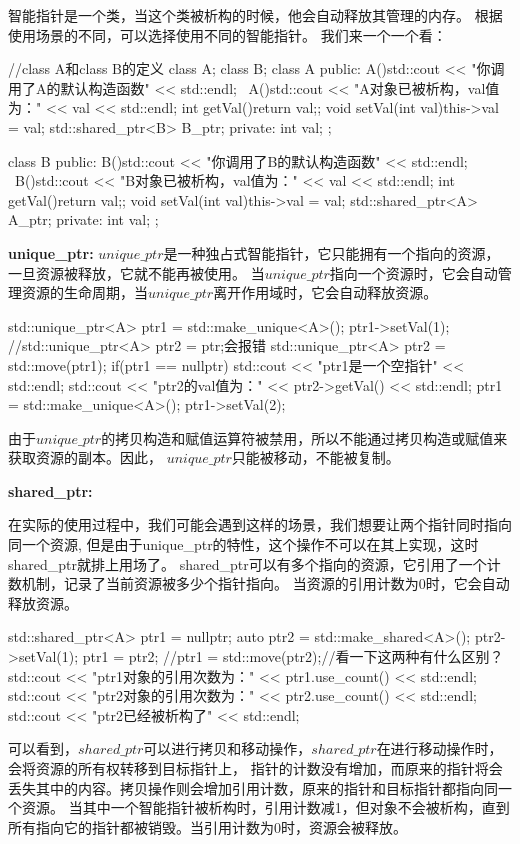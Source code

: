 智能指针是一个类，当这个类被析构的时候，他会自动释放其管理的内存。
根据使用场景的不同，可以选择使用不同的智能指针。
我们来一个一个看：

\begin{tcode}
//class A和class B的定义
class A;
class B;
class A{
public:
    A(){std::cout << "你调用了A的默认构造函数" << std::endl;}
    ~A(){std::cout << "A对象已被析构，val值为：" << val << std::endl;}
    int getVal(){return val;};
    void setVal(int val){this->val = val;}
    std::shared_ptr<B> B_ptr;
private:
    int val;
};

class B{
public:
    B(){std::cout << "你调用了B的默认构造函数" << std::endl;}
    ~B(){std::cout << "B对象已被析构，val值为：" << val << std::endl;}
    int getVal(){return val;};
    void setVal(int val){this->val = val;}
    std::shared_ptr<A> A_ptr;
private:
    int val;    
};
\end{tcode}

\textbf{unique\_ptr:} 
$unique\_ptr$是一种独占式智能指针，它只能拥有一个指向的资源，一旦资源被释放，它就不能再被使用。
当$unique\_ptr$指向一个资源时，它会自动管理资源的生命周期，当$unique\_ptr$离开作用域时，它会自动释放资源。

\begin{tcode}
{
    std::unique_ptr<A> ptr1 = std::make_unique<A>();
    ptr1->setVal(1);
    //std::unique_ptr<A> ptr2 = ptr;会报错
    std::unique_ptr<A> ptr2 = std::move(ptr1);
    if(ptr1 == nullptr){
        std::cout << "ptr1是一个空指针" << std::endl;
    }
    std::cout << "ptr2的val值为：" << ptr2->getVal() << std::endl;
    ptr1 = std::make_unique<A>();
    ptr1->setVal(2);
}
\end{tcode}
由于$unique\_ptr$的拷贝构造和赋值运算符被禁用，所以不能通过拷贝构造或赋值来获取资源的副本。因此，
$unique\_ptr$只能被移动，不能被复制。

\textbf{shared\_ptr:}

在实际的使用过程中，我们可能会遇到这样的场景，我们想要让两个指针同时指向同一个资源,
但是由于unique\_ptr的特性，这个操作不可以在其上实现，这时shared\_ptr就排上用场了。
shared\_ptr可以有多个指向的资源，它引用了一个计数机制，记录了当前资源被多少个指针指向。
当资源的引用计数为0时，它会自动释放资源。

\begin{tcode}
{
{
    std::shared_ptr<A> ptr1 = nullptr;
    {
        auto ptr2 = std::make_shared<A>();
        ptr2->setVal(1);
        ptr1 = ptr2;
        //ptr1 = std::move(ptr2);//看一下这两种有什么区别？
        std::cout << "ptr1对象的引用次数为：" << ptr1.use_count() << std::endl;
        std::cout << "ptr2对象的引用次数为：" << ptr2.use_count() << std::endl;
    }
    std::cout << "ptr2已经被析构了" << std::endl;
}
}
\end{tcode}
可以看到，$shared\_ptr$可以进行拷贝和移动操作，$shared\_ptr$在进行移动操作时，会将资源的所有权转移到目标指针上，
指针的计数没有增加，而原来的指针将会丢失其中的内容。拷贝操作则会增加引用计数，原来的指针和目标指针都指向同一个资源。
当其中一个智能指针被析构时，引用计数减1，但对象不会被析构，直到所有指向它的指针都被销毁。当引用计数为0时，资源会被释放。

